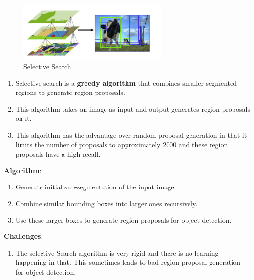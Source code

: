 \begin{table}[h]
    \begin{minipage}[t]{0.39\linewidth}
        \begin{figure}[H]
            \centering
            \includegraphics[width=\linewidth, height=3cm, keepaspectratio]{Pictures/convolutional-neural-network/rcnn-selective-search.png}
            \caption{Selective Search}
        \end{figure}        
    \end{minipage}
    \hfill
    \begin{minipage}[t]{0.59\linewidth}
        \begin{enumerate}
            \item Selective search is a \textbf{greedy algorithm} that combines smaller segmented regions to generate region proposals.
            
            \item This algorithm takes an image as input and output generates region proposals on it.
        
            \item This algorithm has the advantage over random proposal generation in that it limits the number of proposals to approximately 2000 and these region proposals have a high recall.
        \end{enumerate}    
    \end{minipage}
\end{table}


\vspace{0.2cm}
\textbf{Algorithm}:
\begin{enumerate}
    \item Generate initial sub-segmentation of the input image.

    \item Combine similar bounding boxes into larger ones recursively.

    \item Use these larger boxes to generate region proposals for object detection.
\end{enumerate}

\vspace{0.2cm}
\textbf{Challenges}:
\begin{enumerate}
    \item The selective Search algorithm is very rigid and there is no learning happening in that. This sometimes leads to bad region proposal generation for object detection.
\end{enumerate}





























